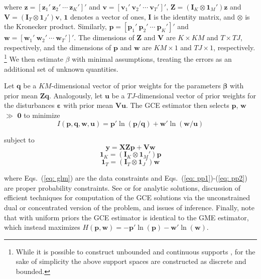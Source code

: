 \documentclass{elsarticle}
\begin{document}
\noindent
where $\mathbf{z}=[\mathbf{z}_1' ~ \mathbf{z}_2' ~ \cdots ~ 
\mathbf{z}_K' ]'$ and $\mathbf{v}=[\mathbf{v}_1' ~ \mathbf{v}_2' ~ 
\cdots ~ \mathbf{v}_T' ]'$, 
$\mathbf{Z}= (\mathbf{I}_K \otimes \mathbf{1}_M')\mathbf{z}$ and
$\mathbf{V}= (\mathbf{I}_T \otimes \mathbf{1}_J')\mathbf{v}$, $\mathbf{1}$ 
denotes a vector of ones, $\mathbf{I}$ is the 
identity matrix, and $\otimes$ is the Kronecker product.
Similarly, $\mathbf{p} = [\mathbf{p}_1' ~ \mathbf{p}_2' ~ \cdots ~ 
\mathbf{p}_K' ]'$ and $\mathbf{w} = [\mathbf{w}_1' ~ \mathbf{w}_2' 
~ \cdots ~ \mathbf{w}_T' ]'$.
The dimensions of $\mathbf{Z}$ and $\mathbf{V}$ are 
$K \times KM$ and $T \times TJ$, respectively, and the dimensions of 
$\mathbf{p}$ and $\mathbf{w}$ are $KM \times 1$ and $TJ \times 1$, 
respectively.%
\footnote{While it is possible to construct unbounded 
and continuous supports \citep{golan2012}, for the sake of simplicity the above 
support spaces are constructed as discrete and bounded.} 
We then estimate $\beta$ with minimal assumptions, treating the errors as an additional 
set of unknown quantities.

Let $\mathbf{q}$ be a $KM$-dimensional vector of prior weights for the 
parameters $\mathbf{\beta}$ with prior mean $\mathbf{Zq}$.
Analogously, let $\mathbf{u}$ be a $TJ$-dimensional vector of prior weights 
for the disturbances $\mathbf{\varepsilon}$ with prior mean $\mathbf{Vu}$.
The GCE estimator then selects $\mathbf{p}$, $\mathbf{w}$ $\gg$ 
$\mathbf{0}$ to minimize 
\begin{equation}
I({\mathbf{p}, \mathbf{q}, \mathbf{w}, \mathbf{u}}) = 
\mathbf{p}' \ln (\mathbf{p}/\mathbf{q}) + 
\mathbf{w}' \ln (\mathbf{w}/\mathbf{u})
\label{eq: ce}
\end{equation}

\noindent
subject to
\begin{equation}
\mathbf{y} = \mathbf{X Z p} 
+ \mathbf{V w}
\label{eq: glm}
\end{equation}
\begin{equation}
\mathbf{1}_K = (\mathbf{I}_K \otimes \mathbf{1}_M')\mathbf{p}
\label{eq: pp1}
\end{equation}
\begin{equation}
\mathbf{1}_T = (\mathbf{I}_T \otimes \mathbf{1}_J')\mathbf{w}
\label{eq: pp2}
\end{equation}

\noindent
where Eqs.\ (\ref{eq: glm}) are the data constraints and Eqs.\ 
(\ref{eq: pp1})-(\ref{eq: pp2}) are proper probability constraints.
See \citet[Chap.\ 6]{golan1996} or \citet[Chap.\ 6]{golan2008} for analytic solutions, 
discussion of efficient techniques for computation of the GCE solutions via the 
unconstrained dual or concentrated version of the problem, and issues of inference.
Finally, note that with uniform priors the GCE estimator is identical to 
the GME estimator, which instead maximizes $H(\mathbf{p},\mathbf{w}) 
= - \mathbf{p}' \ln (\mathbf{p}) - \mathbf{w}' \ln (\mathbf{w})$.
\end{document}
